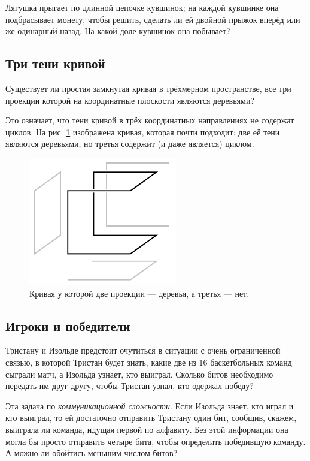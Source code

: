 Лягушка прыгает по длинной цепочке кувшинок;
на каждой кувшинке она подбрасывает монету, чтобы решить,
сделать ли ей двойной прыжок вперёд или же одинарный назад.
На какой доле кувшинок она побывает?

\subsection*{Три тени кривой}\label{Три тени кривой}

Существует ли простая замкнутая кривая в трёхмерном пространстве, все три проекции которой на координатные плоскости являются деревьями?

Это означает, что тени кривой в трёх координатных направлениях не содержат циклов.
На рис. \ref{pic:proj1} изображена кривая, которая почти подходит: две её тени являются деревьями, но третья содержит (и даже является) циклом.

\begin{figure}[htb!]
\centering
\includegraphics[scale=1]{pics/proj1}
\caption{Кривая у которой две проекции --- деревья, а третья --- нет.}
\label{pic:proj1}
\end{figure}

\subsection*{Игроки и победители}

Тристану и Изольде предстоит очутиться в ситуации с очень ограниченной связью, в которой Тристан будет знать, какие две из 16 баскетбольных команд сыграли матч, а Изольда узнает, кто выиграл.
Сколько битов необходимо передать им друг другу, чтобы Тристан узнал, кто одержал победу?


{\sloppy

Эта задача по \emph{коммуникационной сложности}.
Если Изольда знает, кто играл и кто выиграл, то ей достаточно отправить Тристану один бит, сообщив, скажем, выиграла ли команда, идущая первой по алфавиту.
Без этой информации она могла бы просто отправить четыре бита, чтобы определить победившую команду.
А можно ли обойтись меньшим числом битов?

}

